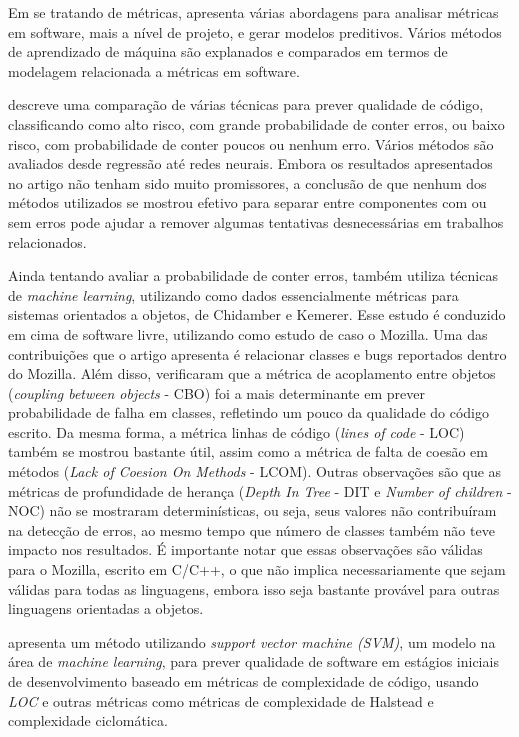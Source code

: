 Em se tratando de métricas,  apresenta várias abordagens para analisar métricas em software, mais a nível de projeto, e gerar modelos preditivos. Vários métodos de aprendizado de máquina são explanados e comparados em termos de modelagem relacionada a métricas em software. 

 descreve uma comparação de várias técnicas para prever qualidade de código, classificando como alto risco, com grande probabilidade de conter erros, ou baixo risco, com probabilidade de conter poucos ou nenhum erro. Vários métodos são avaliados desde regressão até redes neurais. Embora os resultados apresentados no artigo não tenham sido muito promissores, a conclusão de que nenhum dos métodos utilizados se mostrou efetivo para separar entre componentes com ou sem erros pode ajudar a remover algumas tentativas desnecessárias em trabalhos relacionados.

Ainda tentando avaliar a probabilidade de conter erros,  também utiliza técnicas de \textit{machine learning}, utilizando como dados essencialmente métricas para sistemas orientados a objetos, de Chidamber e Kemerer. Esse estudo é conduzido em cima de software livre, utilizando como estudo de caso o Mozilla. Uma das contribuições que o artigo apresenta é relacionar classes e bugs reportados dentro do Mozilla. Além disso, verificaram que a métrica de acoplamento entre objetos (\textit{coupling between objects} - CBO) foi a mais determinante em prever probabilidade de falha em classes, refletindo um pouco da qualidade do código escrito. Da mesma forma, a métrica linhas de código (\textit{lines of code} - LOC) também se mostrou bastante útil, assim como a métrica de falta de coesão em métodos (\textit{Lack of Coesion On Methods} - LCOM). Outras observações são que as métricas de profundidade de herança (\textit{Depth In Tree} - DIT e \textit{Number of children} - NOC) não se mostraram determinísticas, ou seja, seus valores não contribuíram na detecção de erros, ao mesmo tempo que  número de classes também não teve impacto nos resultados. É importante notar que essas observações são válidas para o Mozilla, escrito em C/C++, o que não implica necessariamente que sejam válidas para todas as linguagens, embora isso seja bastante provável para outras linguagens orientadas a objetos.

 apresenta um método utilizando \textit{support vector machine (SVM)}, um modelo na área de \textit{machine learning}, para prever qualidade de software em estágios iniciais de desenvolvimento baseado em métricas de complexidade de código, usando \textit{LOC} e outras métricas como métricas de complexidade de Halstead e complexidade ciclomática.

